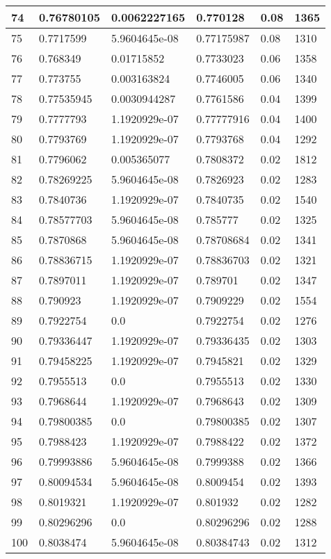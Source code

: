 \begin{longtable}{|l|l|l|l|l|l|}
74 & 0.76780105 & 0.0062227165 & 0.770128 & 0.08 & 1365 \\ \hline 
75 & 0.7717599 & 5.9604645e-08 & 0.77175987 & 0.08 & 1310 \\ \hline 
76 & 0.768349 & 0.01715852 & 0.7733023 & 0.06 & 1358 \\ \hline 
77 & 0.773755 & 0.003163824 & 0.7746005 & 0.06 & 1340 \\ \hline 
78 & 0.77535945 & 0.0030944287 & 0.7761586 & 0.04 & 1399 \\ \hline 
79 & 0.7777793 & 1.1920929e-07 & 0.77777916 & 0.04 & 1400 \\ \hline 
80 & 0.7793769 & 1.1920929e-07 & 0.7793768 & 0.04 & 1292 \\ \hline 
81 & 0.7796062 & 0.005365077 & 0.7808372 & 0.02 & 1812 \\ \hline 
82 & 0.78269225 & 5.9604645e-08 & 0.7826923 & 0.02 & 1283 \\ \hline 
83 & 0.7840736 & 1.1920929e-07 & 0.7840735 & 0.02 & 1540 \\ \hline 
84 & 0.78577703 & 5.9604645e-08 & 0.785777 & 0.02 & 1325 \\ \hline 
85 & 0.7870868 & 5.9604645e-08 & 0.78708684 & 0.02 & 1341 \\ \hline 
86 & 0.78836715 & 1.1920929e-07 & 0.78836703 & 0.02 & 1321 \\ \hline 
87 & 0.7897011 & 1.1920929e-07 & 0.789701 & 0.02 & 1347 \\ \hline 
88 & 0.790923 & 1.1920929e-07 & 0.7909229 & 0.02 & 1554 \\ \hline 
89 & 0.7922754 & 0.0 & 0.7922754 & 0.02 & 1276 \\ \hline 
90 & 0.79336447 & 1.1920929e-07 & 0.79336435 & 0.02 & 1303 \\ \hline 
91 & 0.79458225 & 1.1920929e-07 & 0.7945821 & 0.02 & 1329 \\ \hline 
92 & 0.7955513 & 0.0 & 0.7955513 & 0.02 & 1330 \\ \hline 
93 & 0.7968644 & 1.1920929e-07 & 0.7968643 & 0.02 & 1309 \\ \hline 
94 & 0.79800385 & 0.0 & 0.79800385 & 0.02 & 1307 \\ \hline 
95 & 0.7988423 & 1.1920929e-07 & 0.7988422 & 0.02 & 1372 \\ \hline 
96 & 0.79993886 & 5.9604645e-08 & 0.7999388 & 0.02 & 1366 \\ \hline 
97 & 0.80094534 & 5.9604645e-08 & 0.8009454 & 0.02 & 1393 \\ \hline 
98 & 0.8019321 & 1.1920929e-07 & 0.801932 & 0.02 & 1282 \\ \hline 
99 & 0.80296296 & 0.0 & 0.80296296 & 0.02 & 1288 \\ \hline 
100 & 0.8038474 & 5.9604645e-08 & 0.80384743 & 0.02 & 1312 \\ \hline 
\end{longtable}
